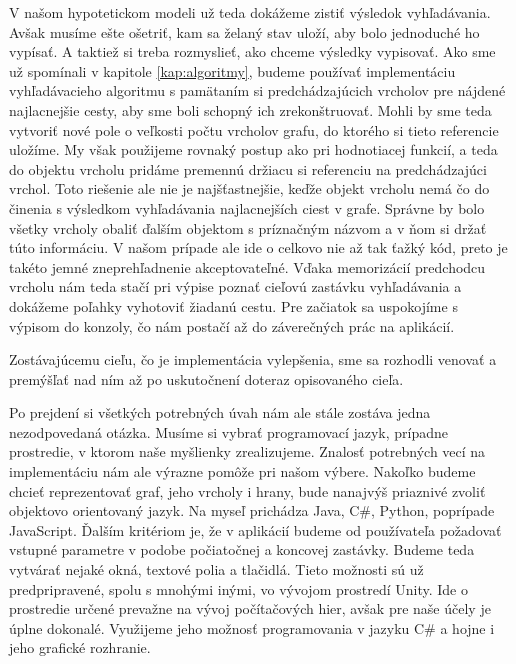 V našom hypotetickom modeli už teda dokážeme zistiť výsledok vyhľadávania. Avšak musíme ešte ošetriť, kam sa želaný stav uloží, aby bolo jednoduché ho vypísať. A taktiež si treba rozmyslieť, ako chceme výsledky vypisovať. Ako sme už spomínali v kapitole \ref{kap:algoritmy}, budeme používať implementáciu vyhľadávacieho algoritmu s pamätaním si predchádzajúcich vrcholov pre nájdené najlacnejšie cesty, aby sme boli schopný ich zrekonštruovať. Mohli by sme teda vytvoriť nové pole o veľkosti počtu vrcholov grafu, do ktorého si tieto referencie uložíme. My však použijeme rovnaký postup ako pri hodnotiacej funkcií, a teda do objektu vrcholu pridáme premennú držiacu si referenciu na predchádzajúci vrchol. Toto riešenie ale nie je najšťastnejšie, keďže objekt vrcholu nemá čo do činenia s výsledkom vyhľadávania najlacnejších ciest v grafe. Správne by bolo všetky vrcholy obaliť ďalším objektom s príznačným názvom a v ňom si držať túto informáciu. V našom prípade ale ide o celkovo nie až tak ťažký kód, preto je takéto jemné zneprehľadnenie akceptovateľné. Vďaka memorizácií predchodcu vrcholu nám teda stačí pri výpise poznať cieľovú zastávku vyhľadávania a dokážeme poľahky vyhotoviť žiadanú cestu. Pre začiatok sa uspokojíme s výpisom do konzoly, čo nám postačí až do záverečných prác na aplikácií.\newline

Zostávajúcemu cieľu, čo je implementácia vylepšenia, sme sa rozhodli venovať a premýšľať nad ním až po uskutočnení doteraz opisovaného cieľa.\newline

Po prejdení si všetkých potrebných úvah nám ale stále zostáva jedna nezodpovedaná otázka. Musíme si vybrať programovací jazyk, prípadne prostredie, v ktorom naše myšlienky zrealizujeme. Znalosť potrebných vecí na implementáciu nám ale výrazne pomôže pri našom výbere. Nakoľko budeme chcieť reprezentovať graf, jeho vrcholy i hrany, bude nanajvýš priaznivé zvoliť objektovo orientovaný jazyk. Na myseľ prichádza Java, C\#, Python, poprípade JavaScript. Ďalším kritériom je, že v aplikácií budeme od používateľa požadovať vstupné parametre v podobe počiatočnej a koncovej zastávky. Budeme teda vytvárať nejaké okná, textové polia a tlačidlá. Tieto možnosti sú už predpripravené, spolu s mnohými inými, vo vývojom prostredí Unity. Ide o prostredie určené prevažne na vývoj počítačových hier, avšak pre naše účely je úplne dokonalé. Využijeme jeho možnosť programovania v jazyku C\# a hojne i jeho grafické rozhranie.\newline


